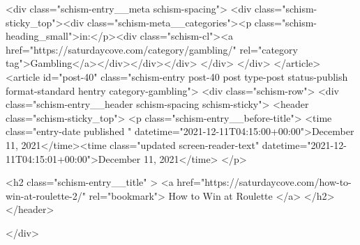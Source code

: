{		<div class="schism-entry__meta schism-spacing">			<div class="schism-sticky_top"><div class="schism-meta__categories"><p class="schism-heading_small">in:</p><div class="schism-cl"><a href="https://saturdaycove.com/category/gambling/" rel="category tag">Gambling</a></div></div></div>		</div>
	</div>
</article>
<article id="post-40" class="schism-entry post-40 post type-post status-publish format-standard hentry category-gambling">
	<div class="schism-row">		<div class="schism-entry__header schism-spacing schism-sticky">			<header class="schism-sticky_top">				<p class="schism-entry__before-title">
					<time class="entry-date published " datetime="2021-12-11T04:15:00+00:00">December 11, 2021</time><time class="updated screen-reader-text" datetime="2021-12-11T04:15:01+00:00">December 11, 2021</time>				</p>

				<h2 class="schism-entry__title" >
					<a href="https://saturdaycove.com/how-to-win-at-roulette-2/" rel="bookmark">
						How to Win at Roulette					</a>
				</h2>
			</header>

					</div>

}
